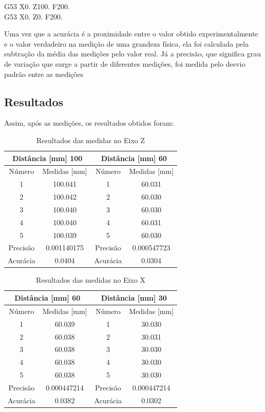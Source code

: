 \begin{center}
    G53 X0. Z100. F200. \\
    G53 X0. Z0. F200. 
\end{center}

Uma vez que a acurácia é a proximidade entre o valor obtido experimentalmente e o valor verdadeiro na medição de uma grandeza física, ela foi calculada pela subtração da média das medições pelo valor real. Já a precisão, que significa grau de variação que surge a partir de diferentes medições, foi medida pelo desvio padrão entre as medições

\subsection{Resultados} 
Assim, após as medições, os resultados obtidos foram: 

\begin{table}[H]
\centering
\caption{Resultados das medidas no Eixo Z}
\begin{tabular}{|c|c|c|c|}
\hline
\multicolumn{2}{|c|}{Distância [mm] 100} & \multicolumn{2}{|c|}{Distância [mm] 60} \\ \hline
Número & Medidas [mm] & Número & Medidas [mm] \\ \hline
1 & 100.041 & 1 & 60.031 \\ \hline
2 & 100.042 & 2 & 60.030 \\ \hline
3 & 100.040 & 3 & 60.030 \\ \hline
4 & 100.040 & 4 & 60.031 \\ \hline
5 & 100.039 & 5 & 60.030 \\ \hline
Precisão & 0.001140175 & Precisão & 0.000547723 \\ \hline
Acurácia & 0.0404 & Acurácia & 0.0304 \\ \hline
\end{tabular}
\end{table}

\begin{table}[H]
\centering
\caption{Resultados das medidas no Eixo X}
\begin{tabular}{|c|c|c|c|}
\hline
\multicolumn{2}{|c|}{Distância [mm] 60} & \multicolumn{2}{|c|}{Distância [mm] 30} \\ \hline
Número & Medidas [mm] & Número & Medidas [mm] \\ \hline
1 & 60.039 & 1 & 30.030 \\ \hline
2 & 60.038 & 2 & 30.031 \\ \hline
3 & 60.038 & 3 & 30.030 \\ \hline
4 & 60.038 & 4 & 30.030 \\ \hline
5 & 60.038 & 5 & 30.030 \\ \hline
Precisão & 0.000447214 & Precisão & 0.000447214 \\ \hline
Acurácia & 0.0382 & Acurácia & 0.0302 \\ \hline
\end{tabular}
\end{table}
